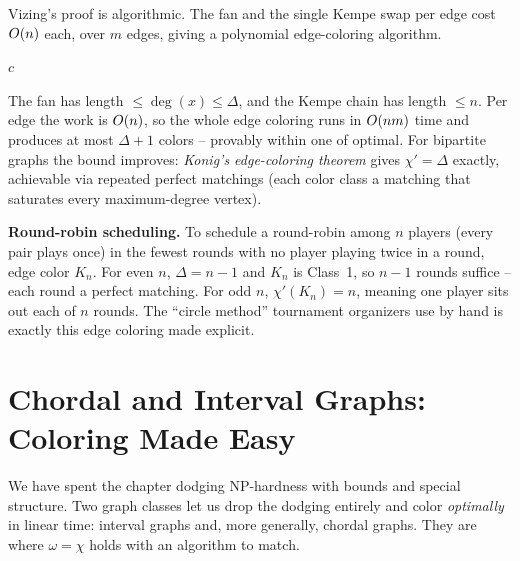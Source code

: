 Vizing's proof is algorithmic. The fan and the single Kempe swap per edge cost
$O(n)$ each, over $m$ edges, giving a polynomial edge-coloring algorithm.

\begin{algorithm}[H]
\caption{\textsc{VizingEdgeColor}$(\Gph)$ -- $(\Delta+1)$-edge-coloring}
\label{ch28:alg-vizing}
\Return $c$\;
\end{algorithm}

\begin{complexitybox}
The fan has length $\le\deg(x)\le\Delta$, and the Kempe chain has length $\le n$.
Per edge the work is $O(n)$, so the whole edge coloring runs in $O(nm)$ time
and produces at most $\Delta+1$ colors -- provably within one of optimal. For
bipartite graphs the bound improves: \emph{Konig's edge-coloring theorem} gives
$\chi'=\Delta$ exactly, achievable via repeated perfect matchings (each color class
a matching that saturates every maximum-degree vertex).
\end{complexitybox}

\begin{applicationbox}
\textbf{Round-robin scheduling.} To schedule a round-robin among $n$ players (every
pair plays once) in the fewest rounds with no player playing twice in a round, edge
color $K_n$. For even $n$, $\Delta=n-1$ and $K_n$ is Class~1, so $n-1$ rounds
suffice -- each round a perfect matching. For odd $n$, $\chi'(K_n)=n$, meaning one
player sits out each of $n$ rounds. The ``circle method'' tournament organizers use
by hand is exactly this edge coloring made explicit.
\end{applicationbox}

\section{Chordal and Interval Graphs: Coloring Made Easy}
\label{ch28:chordal}

We have spent the chapter dodging NP-hardness with bounds and special structure.
Two graph classes let us drop the dodging entirely and color \emph{optimally} in
linear time: interval graphs and, more generally, chordal graphs. They are where
$\omega=\chi$ holds with an algorithm to match.

